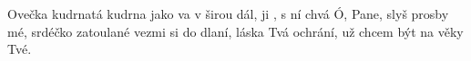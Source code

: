 \begin{TEXT}{Ovečka kudrnatá}
\SLOKA {} kudrna
 jako va 
 v širou dál, 
 ji , 
 s ní  chvá  
\SLOKA Ó, Pane, slyš prosby mé, srdéčko zatoulané 
vezmi si do dlaní, láska Tvá ochrání, 
už chcem být na věky Tvé.  
\end{TEXT}